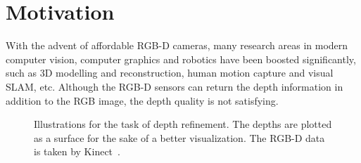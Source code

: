 
\section{Motivation}
With the advent of affordable RGB-D cameras, many research areas in modern computer vision, computer graphics and robotics have been boosted significantly, such as 3D modelling and reconstruction, human motion capture and visual SLAM, etc.
Although the RGB-D sensors can return the depth information in addition to the RGB image, the depth quality is not satisfying.

\begin{figure}[!ht]
    \centering
    \caption{Illustrations for the task of depth refinement. The depths are plotted as a surface for the sake of a better visualization. The RGB-D data is taken by Kinect~\cite{han2013high}.}
    \label{fig:intro_illu}
\end{figure}


